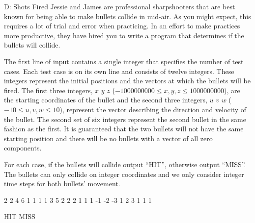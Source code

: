 \begin{problem}{D: Shots Fired}
Jessie and James are professional sharpshooters that are best known for being able to make bullets collide in mid-air.
As you might expect, this requires a lot of trial and error when practicing.
In an effort to make practices more productive, they have hired you to write a program that determines if the bullets will collide.
\end{problem}

\begin{formalin}
The first line of input contains a single integer that specifies the number of test cases.
Each test case is on its own line and consists of twelve integers.
These integers represent the initial positions and the vectors at which the bullets will be fired.
The first three integers, $x$ $y$ $z$ ($-1000000000 \leq x, y, z \leq 1000000000$), are the starting coordinates of the bullet and the second three integers, $u$ $v$ $w$ ($-10 \leq u, v, w \leq 10$), represent the vector describing the direction and velocity of the bullet.
The second set of six integers represent the second bullet in the same fashion as the first.
It is guaranteed that the two bullets will not have the same starting position and there will be no bullets with a vector of all zero components.
\end{formalin}

\begin{formalout}
For each case, if the bullets will collide output ``HIT'', otherwise output ``MISS''.
The bullets can only collide on integer coordinates and we only consider integer time steps for both bullets' movement. 
\end{formalout}

\begin{datain}
2
2 4 6 1 1 1 1 3 5 2 2 2
1 1 1 -1 -2 -3 1 2 3 1 1 1
\end{datain}

\begin{dataout}
HIT
MISS
\end{dataout}

